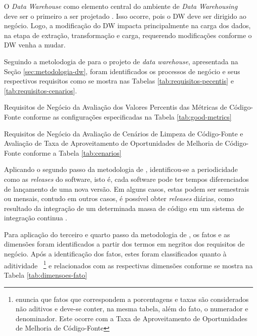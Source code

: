 O \textit{Data Warehouse} como elemento central do ambiente de \textit{Data Warehousing} deve ser o primeiro a ser projetado \cite{Kimball2002}. Isso ocorre, pois o DW deve ser dirigido ao negócio. Logo, a modificação do DW impacta principalmente na carga dos dados, na etapa de extração, transformação e carga, requerendo modificações conforme o DW venha a mudar.

Seguindo a metolodogia de  para o projeto de \textit{data warehouse}, apresentada na Seção \ref{sec:metodologia-dw}, foram identificados os processos de negócio e seus respectivos requisitos como se mostra nas Tabelas \ref{tab:requisitos-pecentis} e \ref{tab:requisitos-cenarios}. 


\begin{table}[H]
\centering

\caption{Requisitos de Negócio da Avaliação dos Valores Percentis das Métricas de Código-Fonte conforme as configurações especificadas na Tabela \ref{tab:good-metrics}}
\label{tab:requisitos-pecentis}
\end{table}
\FloatBarrier


\begin{table}[H]
\centering

\caption{Requisitos de Negócio da Avaliação de Cenários de Limpeza de Código-Fonte e Avaliação de Taxa de Aproveitamento de Oportunidades de Melhoria de Código-Fonte conforme a Tabela \ref{tab:cenarios}}
\label{tab:requisitos-cenarios}
\end{table}
\FloatBarrier


Aplicando o segundo passo da metodologia de , identificou-se a periodicidade como as \textit{releases} do software, isto é, cada software pode ter tempos diferenciados de lançamento de uma nova versão. Em alguns casos, estas podem ser semestrais ou mensais, contudo em outros casos, é possível obter \textit{releases} diárias, como resultado da integração de um determinada massa de código em um sistema de integração continua \cite{beckarticle1999}. 

Para aplicação do terceiro e quarto passo da metodologia de , os fatos e as dimensões foram identificados a partir dos termos em negritos dos requisitos de negócio. Após a identificação dos fatos, estes foram classificados quanto à aditividade~
\footnote{ enuncia que fatos que correspondem a porcentagens e taxas são considerados não aditivos e deve-se conter, na mesma tabela, além do fato, o numerador e denominador. Este ocorre com a Taxa de Aproveitamento de Oportunidades de Melhoria de Código-Fonte} e relacionados com as respectivas dimensões conforme se mostra na Tabela \ref{tab:dimensoes-fato}

